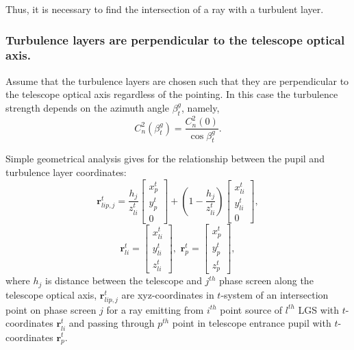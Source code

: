Thus, it is necessary to find the intersection of a ray with a turbulent layer.

\subsubsection{Turbulence layers are perpendicular to the telescope optical
axis.}

Assume that the turbulence layers are chosen such that they are perpendicular
to the telescope optical axis regardless of the pointing.
In this case the turbulence strength depends on the azimuth angle
$\beta_{t}^{g}$, namely,
\begin{equation} \label{eq:turb-vs-beta}
	C_{n}^{2} (\beta_{t}^{g}) = \frac{C_{n}^{2}(0)} {\cos \beta_{t}^{g}}.
\end{equation}

Simple geometrical analysis gives for the
relationship between the pupil and turbulence layer coordinates:
\begin{equation} \label{eq:pupil-to-layer}
  \bm{r}^{t}_{lip,j} =
  \frac{h_{j}}{z^{t}_{li}}
  \left[
  \begin{array}{c}
	  x^{t}_{p} \\
	  y^{t}_{p} \\
	  0
	\end{array}
  \right] +
  (1-\frac{h_{j}}{z^{t}_{li}})
  \left[
  \begin{array}{c}
	  x^{t}_{li} \\
	  y^{t}_{li} \\
	  0
	\end{array}
  \right],
\end{equation}
$$
  \bm{r}^{t}_{li} =
  \left[
  \begin{array}{c}
	  x^{t}_{li} \\
	  y^{t}_{li} \\
	  z^{t}_{li}
	\end{array}
  \right], \,\,
  \bm{r}^{t}_{p} =
  \left[
  \begin{array}{c}
	  x^{t}_{p} \\
	  y^{t}_{p} \\
	  z^{t}_{p}
	\end{array}
  \right],
$$
where $h_{j}$ is distance between the telescope and $j^{th}$ phase screen
along the telescope optical axis,
$\bm{r}^{t}_{lip,j}$ are xyz-coordinates in $t$-system of an
intersection point on phase screen $j$ for a ray emitting from $i^{th}$ point
source of $l^{th}$ LGS with $t$-coordinates $\bm{r}^{t}_{li}$ and
passing through $p^{th}$ point in telescope entrance pupil with $t$-coordinates
$\bm{r}^{t}_{p}$.

